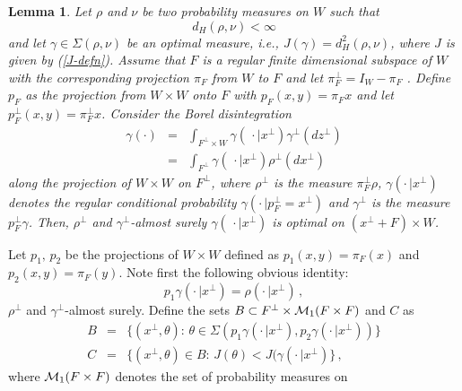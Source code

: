\documentclass[12pt,a4paper]{book}
\newtheorem{lemma}[theorem]{Lemma}
\newtheorem{corollary}[theorem]{Corollary}
\newcommand{\beaa}{\begin{eqnarray*}}
\newcommand{\eeaa}{\end{eqnarray*}}
\newcommand{\ga}{\gamma}
\newcommand{\calM}{{\cal M}}
\newcommand{\proof}{\noindent {\bf Proof:\ }}
\def\squarebox#1{\hbox to #1{\hfill\vbox to #1{\vfill}}}
\newcommand{\qed}{\hspace*{\fill}
           \vbox{\hrule\hbox{\vrule\squarebox{.667em}\vrule}\hrule}\bigskip}
\begin{document}

\begin{lemma}
\label{section-lemma}
Let $\rho$ and $\nu$ be two probability measures on $W$ such that
$$
d_H(\rho,\nu)<\infty
$$
and let $\ga\in\Sigma(\rho,\nu)$ be an optimal measure, i.e.,
$J(\ga)=d_H^2(\rho,\nu)$, where $J$ is given by 
(\ref{J-defn}). Assume that $F$ is a regular 
finite dimensional subspace of $W$ with the 
corresponding projection  $\pi_F$  from $W$ to $F$ and let
$\pi_F^\bot=I_W-\pi_F$ . Define  $p_F$ as  the 
projection from $W\times W$ onto $F$ with $p_F(x,y)=\pi_Fx$ and let
$p_F^\bot(x,y)=\pi_F^\bot x$.  
Consider the Borel disintegration 
\beaa
\ga(\cdot)&=&\int_{F^\bot\times W}\ga(\,\cdot|x^\bot)\ga^\bot(dz^\bot)\\
&=&\int_{F^\bot}\ga(\,\cdot|x^\bot)\rho^\bot(dx^\bot)
\eeaa
along the projection  of $W\times W$ on $F^\bot$, where
$\rho^\bot$ is the measure
$\pi_F^\bot\rho$,  $\ga(\cdot\,|x^\bot)$ denotes the regular 
conditional probability $\ga(\cdot\,|p_F^\bot =x^\bot)$ and $\ga^\bot$
is the measure $p_F^\bot\ga$. Then,
$\rho^\bot$ and $\ga^\bot$-almost surely  
$\ga(\,\cdot|x^\bot)$ is optimal on $(x^\bot+F)\times W$.
\end{lemma}
\proof
Let $p_1,\,p_2$ be the projections of $W\times W$ defined as
$p_1(x,y)=\pi_F(x)$ and $p_2(x,y)=\pi_F(y)$. 
Note first the  following obvious identity:
$$
p_1\ga(\cdot\,|x^\bot)=\rho(\cdot\,|x^\bot)\,,
$$
$\rho^\bot$ and $\ga^\bot$-almost surely.
Define the sets $B\subset F^\bot\times \calM_1(F\times F)$ and $C$ as 
\beaa
B&=&\{(x^\bot,\theta):\,\theta\in\Sigma(p_1\ga(\cdot\,|x^\bot),
p_2\ga(\cdot\,|x^\bot))\}\\
C&=&\{(x^\bot,\theta)\in B:\,J(\theta)<J(\ga(\cdot\,|x^\bot)\}\,,
\eeaa
where $\calM_1(F\times F)$ denotes the set of probability measures on
\end{document}
